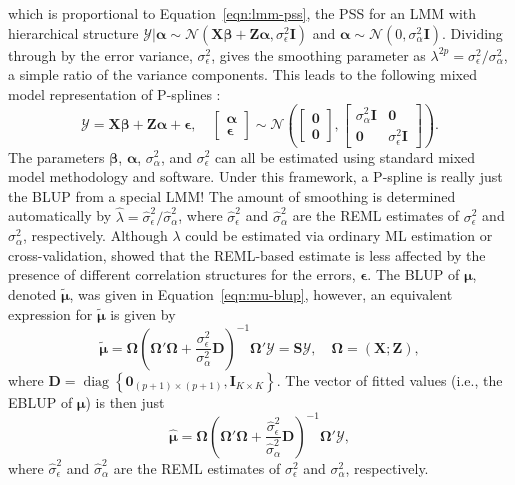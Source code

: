 \documentclass[cmfont,usenames,dvipsnames,leqno]{afit-etd}\usepackage[]{graphicx}\usepackage[]{color}
\newcommand{\bc}[1]{\ensuremath{\bm{\mathcal{#1}}}}
\newcommand{\mc}[1]{\ensuremath{\mathcal{#1}}}
\newcommand{\wh}[1]{\ensuremath{\widehat{#1}}}
\newcommand{\wt}[1]{\ensuremath{\widetilde{#1}}}
\newcommand{\diag}{\operatorname{diag}}
\begin{document}
which is proportional to Equation~\eqref{eqn:lmm-pss}, the PSS for an \ac{LMM} with hierarchical structure $\bc{Y}|\bm{\alpha} \sim \mc{N}(\bm{X}\bm{\beta} + \bm{Z}\bm{\alpha}, \sigma_\epsilon^2\bm{I})$ and $\bm{\alpha} \sim \mc{N}(0, \sigma_\alpha^2\bm{I})$. Dividing through by the error variance, $\sigma_\epsilon^2$, gives the smoothing parameter as $\lambda^{2p} = \sigma_\epsilon^2/\sigma_\alpha^2$, a simple ratio of the variance components. This leads to the following mixed model representation of \ac{P-spline}s \citep{brumback_comment_1999}:
\begin{equation}
\label{eqn:pspline-lmm}
  \bc{Y} = \bm{X}\bm{\beta} + \bm{Z}\bm{\alpha} + \bm{\epsilon}, \quad 
  \begin{bmatrix} 
    \bm{\alpha} \\
    \bm{\epsilon}
  \end{bmatrix} \sim 
    \mc{N}\left(\begin{bmatrix} 
      \bm{0} \\
      \bm{0}
    \end{bmatrix}, \begin{bmatrix} 
    \sigma_\alpha^2\bm{I} & \bm{0} \\
    \bm{0} & \sigma_\epsilon^2\bm{I}
  \end{bmatrix}\right).
\end{equation}
The parameters $\bm{\beta}$, $\bm{\alpha}$, $\sigma_\alpha^2$, and $\sigma_\epsilon^2$ can all be estimated using standard mixed model methodology and software. Under this framework, a \ac{P-spline} is really just the \ac{BLUP} from a special \ac{LMM}! The amount of smoothing is determined automatically by $\wh{\lambda} = \wh{\sigma}_\epsilon^2/\wh{\sigma}_\alpha^2$, where $\wh{\sigma}_\epsilon^2$ and $\wh{\sigma}_\alpha^2$ are the \ac{REML} estimates of $\sigma_\epsilon^2$ and $\sigma_\alpha^2$, respectively. Although $\lambda$ could be estimated via ordinary \ac{ML} estimation or cross-validation, \citet{krivobokova_note_2007} showed that the \ac{REML}-based estimate is less affected by the presence of different correlation structures for the errors, $\bm{\epsilon}$. The \ac{BLUP} of $\bm{\mu}$, denoted $\wt{\bm{\mu}}$, was given in Equation~\eqref{eqn:mu-blup}, however, an equivalent expression for $\wt{\bm{\mu}}$ is given by
\begin{equation*}
  \wt{\bm{\mu}} = \bm{\Omega}\left( \bm{\Omega}'\bm{\Omega} + \frac{\sigma_\epsilon^2}{\sigma_\alpha^2}\bm{D} \right)^{-1}\bm{\Omega}'\bc{Y} = \bm{S}\bc{Y}, \quad \bm{\Omega} = \left(\bm{X}; \bm{Z}\right),
\end{equation*}
where $\textbf{D} = \diag\left\{\bm{0}_{(p+1) \times (p+1)}, \bm{I}_{K \times K}\right\}$. The vector of fitted values (i.e., the \ac{EBLUP} of $\bm{\mu}$) is then just
\begin{equation*}
  \wh{\bm{\mu}} = \bm{\Omega}\left( \bm{\Omega}'\bm{\Omega} + \frac{\wh{\sigma}_\epsilon^2}{\wh{\sigma}_\alpha^2}\bm{D} \right)^{-1}\bm{\Omega}'\bc{Y},
\end{equation*}
where $\wh{\sigma}_\epsilon^2$ and $\wh{\sigma}_\alpha^2$ are the \ac{REML} estimates of $\sigma_\epsilon^2$ and $\sigma_\alpha^2$, respectively.
\end{document}
